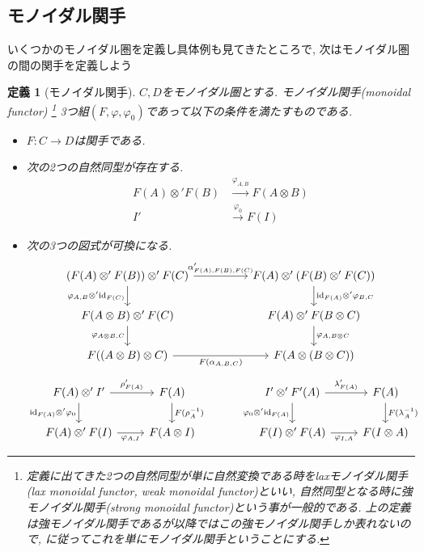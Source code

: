 \documentclass[a4paper,12pt]{ltjsarticle}
\theoremstyle{break}
\newtheorem{defn}[thm]{定義}
\newcommand{\xr}[1]{\xrightarrow{#1}}
\newcommand{\id}{\mathrm{id}}
\newcommand{\al}{\alpha}
\newcommand{\la}{\lambda}
\newcommand{\vp}{\varphi}
\newcommand{\ot}{\otimes}
\numberwithin{equation}{section}
\begin{document}
\subsection{モノイダル関手}

いくつかのモノイダル圏を定義し具体例も見てきたところで, 次はモノイダル圏の間の関手を定義しよう

\begin{defn}[モノイダル関手]
  $C,D$をモノイダル圏とする. 
  モノイダル関手(monoidal functor)
  \footnote{
  定義に出てきた2つの自然同型が単に自然変換である時をlaxモノイダル関手(lax monoidal functor, weak monoidal functor)といい, 自然同型となる時に強モノイダル関手(strong monoidal functor)という事が一般的である.
  上の定義は強モノイダル関手であるが以降ではこの強モノイダル関手しか表れないので, \cite{cfqt}に従ってこれを単にモノイダル関手ということにする. 
  }
  3つ組$(F,\vp,\vp_0)$であって以下の条件を満たすものである. 
  \begin{itemize}
    \item $F: C \to D$は関手である. 
    \item 次の2つの自然同型が存在する. 
      \begin{align*}
        F(A) \ot' F(B) &\xr{\vp_{A,B}} F(A \ot B) \\
        I' &\xr{\vp_0} F(I)
      \end{align*}  
    \item 次の3つの図式が可換になる. 
    \[\begin{tikzcd}
      {(F(A) \ot' F(B)) \ot' F(C)} && {F(A) \ot' (F(B) \ot' F(C))} \\
      {F(A \ot B) \ot' F(C)} && {F(A) \ot' F(B \ot C)} \\
      {F((A \ot B) \ot C)} && {F(A \ot (B \ot C))}
      \arrow["{\al'_{F(A),F(B),F(C)}}", from=1-1, to=1-3]
      \arrow["{\vp_{A,B} \ot' \id_{F(C)}}"', from=1-1, to=2-1]
      \arrow["{\vp_{A \ot B,C}}"', from=2-1, to=3-1]
      \arrow["{\id_{F(A)} \ot' \vp_{B,C}}", from=1-3, to=2-3]
      \arrow["{\vp_{A,B \ot C}}", from=2-3, to=3-3]
      \arrow["{F(\al_{A,B,C})}"', from=3-1, to=3-3]
    \end{tikzcd}\]
    \[\begin{tikzcd}
      {F(A) \ot' I'} & {F(A)} && {I' \ot' F'(A)} & {F(A)} \\
      {F(A) \ot' F(I)} & {F(A \ot I)} && {F(I) \ot' F(A)} & {F(I \ot A)}
      \arrow["{\rho'_{F(A)}}", from=1-1, to=1-2]
      \arrow["{\id_{F(A)} \ot' \vp_0}"', from=1-1, to=2-1]
      \arrow["{\vp_{A,I}}"', from=2-1, to=2-2]
      \arrow["{F(\rho_A^{-1})}", from=1-2, to=2-2]
      \arrow["{\la'_{F(A)}}", from=1-4, to=1-5]
      \arrow["{\vp_0 \ot' \id_{F(A)}}"', from=1-4, to=2-4]
      \arrow["{F(\la_A^{-1})}", from=1-5, to=2-5]
      \arrow["{\vp_{I,A}}"', from=2-4, to=2-5]
    \end{tikzcd}\]
  \end{itemize}  
\end{defn}
\end{document}
